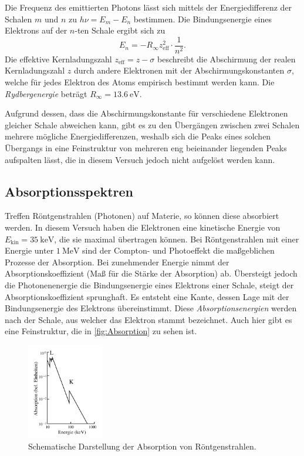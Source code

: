 Die Frequenz des emittierten Photons lässt sich mittels der Energiedifferenz der Schalen $m$ und $n$ zu $h \nu = E_m - E_n$ bestimmen. 
Die Bindungsenergie eines Elektrons auf der $n$-ten Schale ergibt sich zu 
\begin{equation}
    \label{eqn:Bindungsenergie}
    E_n = -R_\infty z^2_\text{eff} \cdot \frac{1}{n^2}.
\end{equation}
Die effektive Kernladungszahl $z_\text{eff} = z - \sigma$ beschreibt die Abschirmung der realen Kernladungszahl $z$ durch andere Elektronen mit der 
Abschirmungskonstanten $\sigma$, welche für jedes Elektron des Atoms empirisch bestimmt werden kann. Die \textit{Rydbergenergie} beträgt 
$R_\infty = \qty{13.6}{\electronvolt}$.  

Aufgrund dessen, dass die Abschirmungskonstante für verschiedene Elektronen gleicher Schale abweichen kann, gibt es zu den Übergängen zwischen zwei Schalen
mehrere mögliche Energiedifferenzen, weshalb sich die Peaks eines solchen Übergangs in eine Feinstruktur von mehreren eng beieinander liegenden Peaks
aufspalten lässt, die in diesem Versuch jedoch nicht aufgelöst werden kann.

\subsection{Absorptionsspektren}
\label{subsec:Absorption}
Treffen Röntgenstrahlen (Photonen) auf Materie, so können diese absorbiert werden.
In diesem Versuch haben die Elektronen eine kinetische Energie von $E_\text{kin} = \qty{35}{\kilo\electronvolt}$, die sie maximal übertragen können. 
Bei Röntgenstrahlen mit einer Energie unter $\qty{1}{\mega\electronvolt}$ sind der Compton- und Photoeffekt die maßgeblichen Prozesse der Absorption.
Bei zunehmender Energie nimmt der Absorptionskoeffizient (Maß für die Stärke der Absorption) ab. Übersteigt jedoch die Photonenenergie die Bindungsenergie
eines Elektrons einer Schale, steigt der Absorptionskoeffizient sprunghaft. Es entsteht eine \glqq Kante\grqq{}, dessen Lage mit der Bindungsenergie des
Elektrons übereinstimmt. Diese \textit{Absorptionsenergien} werden nach der Schale, aus welcher das Elektron stammt bezeichnet. Auch hier gibt es eine
Feinstruktur, die in \autoref{fig:Absorption} zu sehen ist.

\begin{figure}
    \centering
    \includegraphics[width = 0.3\textwidth]{content/Absorption.png}
    \caption{Schematische Darstellung der Absorption von Röntgenstrahlen. \cite{v602}}
    \label{fig:Absorption}
\end{figure}

